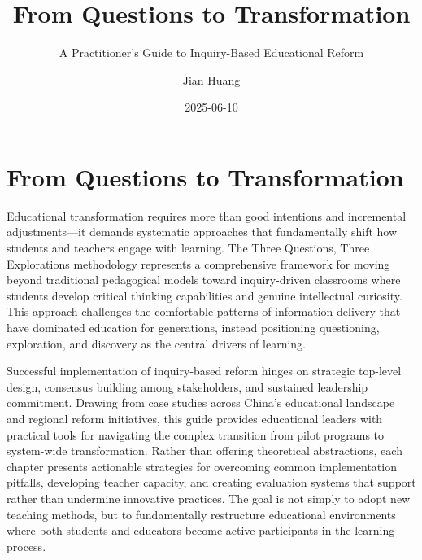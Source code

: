 \documentclass[
  Letterpaper,
]{scrbook}
\title{From Questions to Transformation}
\subtitle{A Practitioner's Guide to Inquiry-Based Educational Reform}
\author{Jian Huang}
\date{2025-06-10}
\renewcommand*\contentsname{Table of contents}
\newcommand\contentsname{Table of contents}
\begin{document}
\frontmatter
\maketitle

\renewcommand*\contentsname{Table of contents}
{
\setcounter{tocdepth}{1}
\tableofcontents
}

\mainmatter
{}

\chapter*{From Questions to
Transformation}\label{from-questions-to-transformation}


Educational transformation requires more than good intentions and
incremental adjustments---it demands systematic approaches that
fundamentally shift how students and teachers engage with learning. The
Three Questions, Three Explorations methodology represents a
comprehensive framework for moving beyond traditional pedagogical models
toward inquiry-driven classrooms where students develop critical
thinking capabilities and genuine intellectual curiosity. This approach
challenges the comfortable patterns of information delivery that have
dominated education for generations, instead positioning questioning,
exploration, and discovery as the central drivers of learning.

Successful implementation of inquiry-based reform hinges on strategic
top-level design, consensus building among stakeholders, and sustained
leadership commitment. Drawing from case studies across China's
educational landscape and regional reform initiatives, this guide
provides educational leaders with practical tools for navigating the
complex transition from pilot programs to system-wide transformation.
Rather than offering theoretical abstractions, each chapter presents
actionable strategies for overcoming common implementation pitfalls,
developing teacher capacity, and creating evaluation systems that
support rather than undermine innovative practices. The goal is not
simply to adopt new teaching methods, but to fundamentally restructure
educational environments where both students and educators become active
participants in the learning process.

\end{document}
